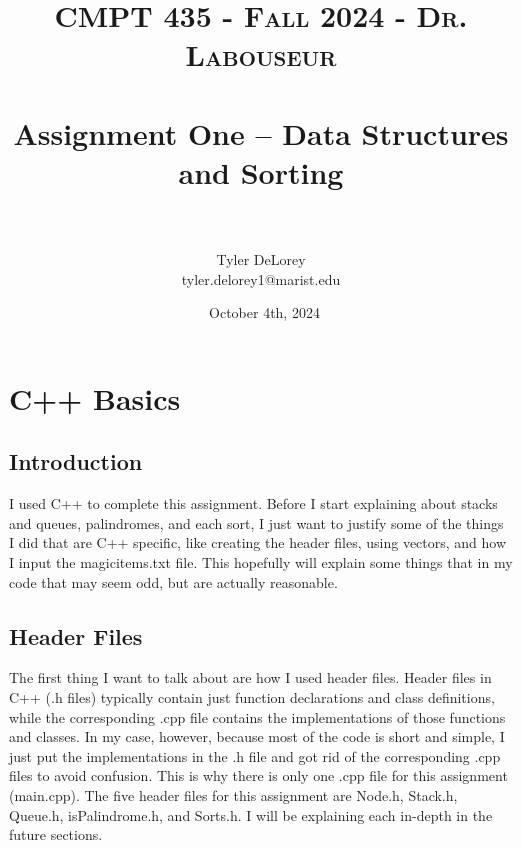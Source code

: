 \documentclass[letterpaper, 10pt]{article}
\title{	
   \normalfont \normalsize 
   \textsc{CMPT 435 - Fall 2024 - Dr. Labouseur} \\[10pt] %
   \horrule{0.5pt} \\[0.25cm] 	%
   \huge Assignment One -- Data Structures \\ and Sorting \\     	    %
   \horrule{0.5pt} \\[0.25cm] 	%
}
\author{Tyler DeLorey \\ \normalsize tyler.delorey1@marist.edu}
\date{\normalsize\ October 4th, 2024}
\begin{document}
 
\maketitle %


\renewcommand{\thefigure}{\thesection.\arabic{figure}}

\vspace{-5em}
\tableofcontents

\section{C++ Basics}
\subsection{Introduction}

\noindent
I used C++ to complete this assignment. Before I start explaining about stacks and queues, palindromes, and each sort, I just want to justify some of the things I did that are C++ specific, like creating the header files, using vectors, and how I input the magicitems.txt file. This hopefully will explain some things that in my code that may seem odd, but are actually reasonable.

\subsection{Header Files}
\noindent
The first thing I want to talk about are how I used header files. Header files in C++ (.h files) typically contain just function declarations and class definitions, while the corresponding .cpp file contains the implementations of those functions and classes. In my case, however, because most of the code is short and simple, I just put the implementations in the .h file and got rid of the corresponding .cpp files to avoid confusion. This is why there is only one .cpp file for this assignment (main.cpp). The five header files for this assignment are Node.h, Stack.h, Queue.h, isPalindrome.h, and Sorts.h. I will be explaining each in-depth in the future sections. 
\end{document}
